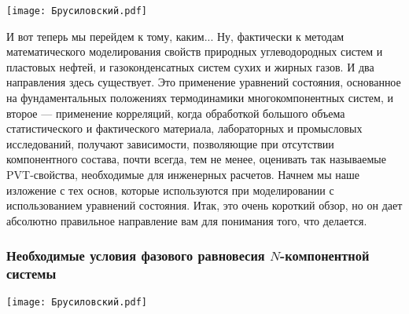 \documentclass[main.tex]{subfiles}
\begin{document}
\begin{center}
\texttt{[image: Брусиловский.pdf]}
\end{center}

И вот теперь мы перейдем к тому, каким...
Ну, фактически к методам математического моделирования свойств природных углеводородных систем и пластовых нефтей, и газоконденсатных систем сухих и жирных газов.
И два направления здесь существует.
Это применение уравнений состояния, основанное на фундаментальных положениях термодинамики многокомпонентных систем, и второе — применение корреляций, когда обработкой большого объема статистического и фактического материала, лабораторных и промысловых исследований, получают зависимости, позволяющие при отсутствии компонентного состава, почти всегда, тем не менее, оценивать так называемые PVT-свойства, необходимые для инженерных расчетов.
Начнем мы наше изложение с тех основ, которые используются при моделировании с использованием уравнений состояния.
Итак, это очень короткий обзор, но он дает абсолютно правильное направление вам для понимания того, что делается.

\subsubsection{Необходимые условия фазового равновесия $N$-компонентной системы}

\begin{center}
\texttt{[image: Брусиловский.pdf]}
\end{center}
\end{document}
